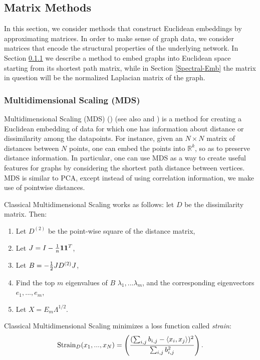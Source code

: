 \subsection{Matrix Methods}
In this section, we consider methods that construct Euclidean embeddings by approximating matrices. In order to make sense of graph data, we consider matrices that encode the structural properties of the underlying network. In Section \ref{MDS} we describe a method to embed graphs into Euclidean space starting from its shortest path matrix, while in Section \ref{Spectral-Emb} the matrix in question will be the normalized Laplacian matrix of the graph.

\subsubsection{Multidimensional Scaling (MDS)}\label{MDS}
Multidimensional Scaling (MDS) (\cite{kruskal1964multidimensional}) (see also \cite{cox2000multidimensional} and \cite{borg2003modern}) is a method for creating a Euclidean embedding of data for which one has information about distance or dissimilarity among the datapoints. For instance, given an $N \times N$ matrix of distances between $N$ points, one can embed the points into $\mathbb{R}^k$, so as to preserve distance information. In particular, one can use MDS as a way to create useful features for graphs by considering the shortest path distance between vertices. MDS is similar to PCA, except instead of using correlation information, we make use of pointwise distances.

Classical Multidimensional Scaling works as follows: let $D$ be the dissimilarity matrix. Then:
\begin{enumerate}
  \item Let $D^{(2)}$ be the point-wise square of the distance matrix,
  \item Let $J = I - {1\over n}{\mathbf{1}}{\mathbf{1}}^T$,
  \item Let $B = -{1 \over 2}JD^{(2)}J$,
  \item Find the top $m$ eigenvalues of $B$ $\lambda_1, ... \lambda_m$, and the corresponding eigenvectors $e_1, ... , e_m$,
  \item Let $X = E_m\Lambda^{1/2}$.
\end{enumerate}

Classical Multidimensional Scaling minimizes a loss function called \emph{strain}:
\[
    \text{Strain}_D(x_1, ... , x_N) = \left( ({\sum_{i,j}b_{i,j}- \langle x_i,x_j \rangle})^2 \over \sum_{i,j}b_{i,j}^2\right).
\]

